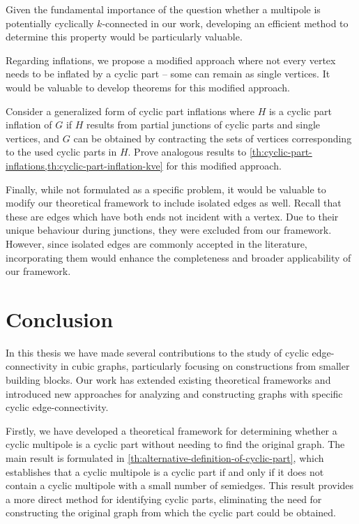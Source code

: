 \documentclass[12pt, twoside]{book}
\begin{document}
Given the fundamental importance of the question whether a multipole is potentially cyclically $k$-connected in our work, developing an efficient method to determine this property would be particularly valuable.

Regarding inflations, we propose a modified approach where not every vertex needs to be inflated by a cyclic part -- some can remain as single vertices. It would be valuable to develop theorems for this modified approach.

\begin{problem}
	Consider a generalized form of cyclic part inflations where $H$ is a cyclic part inflation of $G$ if $H$ results from partial junctions of cyclic parts and single vertices, and $G$ can be obtained by contracting the sets of vertices corresponding to the used cyclic parts in $H$. Prove analogous results to \cref{th:cyclic-part-inflations,th:cyclic-part-inflation-kve} for this modified approach.
\end{problem}

Finally, while not formulated as a specific problem, it would be valuable to modify our theoretical framework to include isolated edges as well. Recall that these are edges which have both ends not incident with a vertex. Due to their unique behaviour during junctions, they were excluded from our framework. However, since isolated edges are commonly accepted in the literature, incorporating them would enhance the completeness and broader applicability of our framework.

\chapter*{Conclusion}

In this thesis we have made several contributions to the study of cyclic edge-connectivity in cubic graphs, particularly focusing on constructions from smaller building blocks. Our work has extended existing theoretical frameworks and introduced new approaches for analyzing and constructing graphs with specific cyclic edge-connectivity.

Firstly, we have developed a theoretical framework for determining whether a cyclic multipole is a cyclic part without needing to find the original graph. The main result is formulated in \cref{th:alternative-definition-of-cyclic-part}, which establishes that a cyclic multipole is a cyclic part if and only if it does not contain a cyclic multipole with a small number of semiedges. This result provides a more direct method for identifying cyclic parts, eliminating the need for constructing the original graph from which the cyclic part could be obtained.
\end{document}
